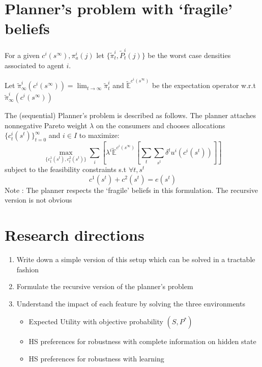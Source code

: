 \documentclass[a4paper,12pt]{article}
\begin{document}
\section{Planner's problem with `fragile' beliefs}
\noindent For a given $c^i(s^{\infty}), \pi^i_a(j)$ let $\{\tilde{\pi}^i_t, \tilde{P}_t^i(j)\}$ be the worst case densities associated to agent $i$. 

\noindent Let $\tilde{\pi}^i_{\infty}(c^i(s^{\infty}))=\lim_{t\to\infty}\tilde{\pi}^i_t$ and $\tilde{\mathbb{E}}^{c^i(s^{\infty})}$ be the expectation operator w.r.t $\tilde{\pi}^i_{\infty}(c^i(s^{\infty}))$


\noindent The (sequential) Planner's problem is described as follows. The planner attaches nonnegative Pareto weight $\lambda$ on the
consumers and chooses allocations $\{c^i_t(s^t)\}_{t=0}^{\infty}$ and $i \in I$ to maximize:
\[
\max_{\{c^1_t(s^t),c^2_t(s^t)\}} \sum_i\left[\lambda^i \tilde{\mathbb{E}}^{c^i(s^{\infty})}\left[\sum_t\sum_{s^t}\delta^tu^i(c^i(s^t))\right]\right ]
\]
subject to the feasibility constraints
s.t $\forall t, s^t$
\[c^1(s^t)+c^2(s^t)=e(s^t)\]
\noindent Note : The planner respects the `fragile' beliefs  in this formulation. The recursive version is not obvious
\section{Research directions}
\begin{enumerate}
	\item Write down a simple version of this setup which can be solved in a tractable fashion
	\item Formulate the recursive version of the planner's problem
	
	\item Understand the impact of each feature by solving the three environments
	
\begin{itemize}
	\item Expected Utility with objective probability $(S,P^*)$
	\item HS preferences for robustness with complete information on hidden state
	\item HS preferences for robustness with learning
\end{itemize}


\end{enumerate}
\newpage
\end{document}
